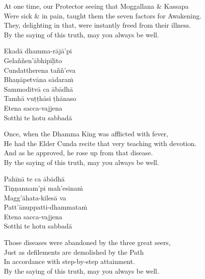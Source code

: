 \begin{english-verses}
  At one time, our Protector seeing that Moggallana \& Kassapa\\
  Were sick \& in pain, taught them the seven factors for Awakening.\\
  They, delighting in that, were instantly freed from their illness.\\
  By the saying of this truth, may you always be well.
\end{english-verses}

\begin{pali-hang-continued}
  Ekadā dhamma-rājā'pi\\
  Gelaññen'ābhipīḷito\\
  Cundattherena taññ'eva\\
  Bhaṇāpetvāna sādaraṁ\\
  Sammoditvā ca ābādhā\\
  Tamhā vuṭṭhāsi ṭhānaso\\
  Etena sacca-vajjena\\
  Sotthi te hotu sabbadā
\end{pali-hang-continued}

\begin{english-verses}
  Once, when the Dhamma King was afflicted with fever,\\
  He had the Elder Cunda recite that very teaching with devotion.\\
  And as he approved, he rose up from that disease.\\
  By the saying of this truth, may you always be well.
\end{english-verses}

\begin{pali-hang-continued}
  Pahīnā te ca ābādhā\\
  Tiṇṇannam'pi mah'esinaṁ\\
  Magg'āhata-kilesā va\\
  Patt'ānuppatti-dhammataṁ\\
  Etena sacca-vajjena\\
  Sotthi te hotu sabbadā
\end{pali-hang-continued}

\begin{english-verses}
  Those diseases were abandoned by the three great seers,\\
  Just as defilements are demolished by the Path\\
  In accordance with step-by-step attainment.\\
  By the saying of this truth, may you always be well.
\end{english-verses}

